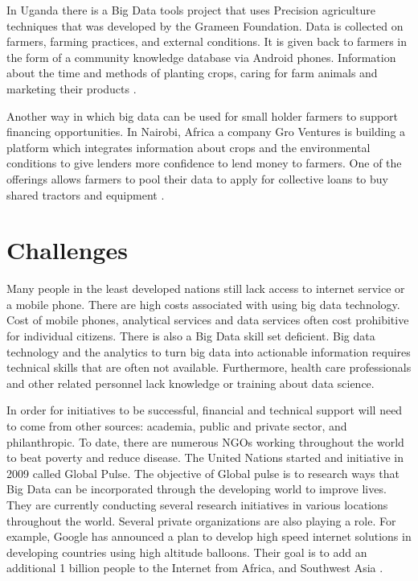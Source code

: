 \documentclass[sigconf]{acmart}
\begin{document}
In Uganda there is a Big Data tools project that uses Precision agriculture techniques that was developed by the Grameen Foundation. Data is collected on farmers, farming practices, and external conditions. It is given back to farmers in the form of a community knowledge database via Android phones. Information about the time and methods of planting crops, caring for farm animals and marketing their products \cite{www-google-Hffpst}.

Another way in which big data can be used for small holder farmers to support financing opportunities. In Nairobi, Africa a company Gro Ventures is building a platform which integrates information about crops and the environmental conditions to give lenders more confidence to lend money to farmers. One of the offerings allows farmers to pool their data to apply for collective loans to buy shared tractors and equipment \cite{www-google-Hffpst}.   

\section{Challenges}
Many people in the least developed nations still lack access to internet service or a mobile phone. There are high costs associated with using big data technology. Cost of mobile phones, analytical services and data services often cost prohibitive for individual citizens. There is also a Big Data skill set deficient. Big data technology and the analytics to turn big data into actionable information requires technical skills that are often not available. Furthermore, health care professionals and other related personnel lack knowledge or training about data science. 

In order for initiatives to be successful, financial and technical support will need to come from other sources: academia, public and private sector, and philanthropic. To date, there are numerous NGOs working throughout the world to beat poverty and reduce disease. The United Nations started and initiative in 2009 called Global Pulse. The objective of Global pulse is to research ways that Big Data can be incorporated through the developing world to improve lives. They are currently conducting several research initiatives in various locations throughout the world. Several private organizations are also playing a role. For example, Google has announced a plan to develop high speed internet solutions in developing countries using high altitude balloons. Their goal is to add an additional 1 billion people to the Internet from Africa, and Southwest Asia \cite{DevEcon}. 
\end{document}
